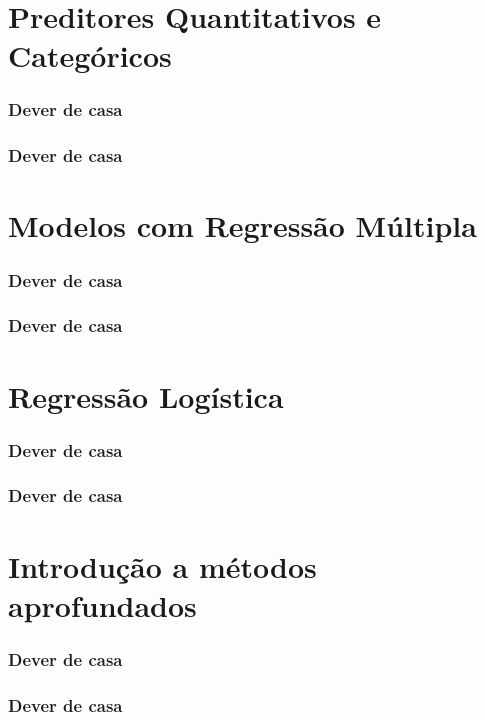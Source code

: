 \documentclass[graphics,14pt]{beamer}
\begin{document}
\section{Preditores Quantitativos e Categóricos}
\begin{frame}[t,fragile=singleslide]
\frametitle{Dever de casa}
\end{frame}
\begin{frame}[t,fragile=singleslide]
\frametitle{Dever de casa}
\end{frame}
\section{Modelos com Regressão Múltipla}
\begin{frame}[t,fragile=singleslide]
\frametitle{Dever de casa}
\end{frame}
\begin{frame}[t,fragile=singleslide]
\frametitle{Dever de casa}
\end{frame}
\section{Regressão Logística}
\begin{frame}[t,fragile=singleslide]
\frametitle{Dever de casa}
\end{frame}
\begin{frame}[t,fragile=singleslide]
\frametitle{Dever de casa}
\end{frame}
\section{Introdução a métodos aprofundados}
\begin{frame}[t,fragile=singleslide]
\frametitle{Dever de casa}
\end{frame}
\begin{frame}[t,fragile=singleslide]
\frametitle{Dever de casa}
\end{frame}
\end{document}

